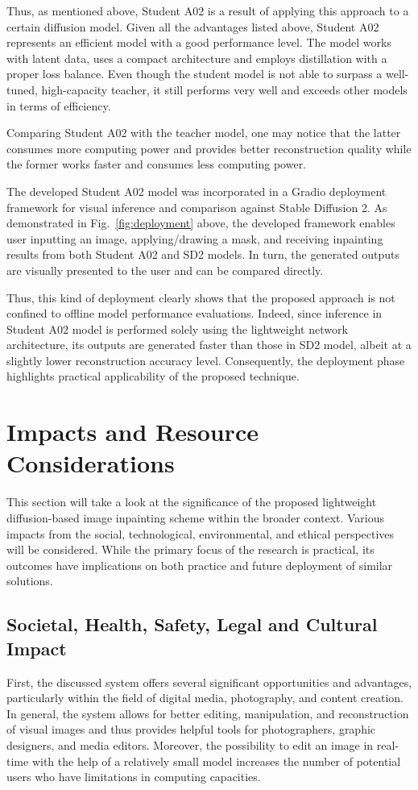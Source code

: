 \documentclass[journal]{IEEEtran}
\begin{document}
Thus, as mentioned above, Student A02 is a result of applying this approach to a certain diffusion model. Given all the advantages listed above, Student A02 represents an efficient model with a good performance level. The model works with latent data, uses a compact architecture and employs distillation with a proper loss balance. Even though the student model is not able to surpass a well-tuned, high-capacity teacher, it still performs very well and exceeds other models in terms of efficiency.

Comparing Student A02 with the teacher model, one may notice that the latter consumes more computing power and provides better reconstruction quality while the former works faster and consumes less computing power.

The developed Student A02 model was incorporated in a Gradio deployment framework for visual inference and comparison against Stable Diffusion 2. As demonstrated in Fig.~\ref{fig:deployment} above, the developed framework enables user inputting an image, applying/drawing a mask, and receiving inpainting results from both Student A02 and SD2 models. In turn, the generated outputs are visually presented to the user and can be compared directly.

Thus, this kind of deployment clearly shows that the proposed approach is not confined to offline model performance evaluations. Indeed, since inference in Student A02 model is performed solely using the lightweight network architecture, its outputs are generated faster than those in SD2 model, albeit at a slightly lower reconstruction accuracy level. Consequently, the deployment phase highlights practical applicability of the proposed technique.

\section{Impacts and Resource Considerations}
This section will take a look at the significance of the proposed lightweight diffusion-based image inpainting scheme within the broader context. Various impacts from the social, technological, environmental, and ethical perspectives will be considered. While the primary focus of the research is practical, its outcomes have implications on both practice and future deployment of similar solutions.

\subsection{Societal, Health, Safety, Legal and Cultural Impact}
First, the discussed system offers several significant opportunities and advantages, particularly within the field of digital media, photography, and content creation. In general, the system allows for better editing, manipulation, and reconstruction of visual images and thus provides helpful tools for photographers, graphic designers, and media editors. Moreover, the possibility to edit an image in real-time with the help of a relatively small model increases the number of potential users who have limitations in computing capacities.
\end{document}
